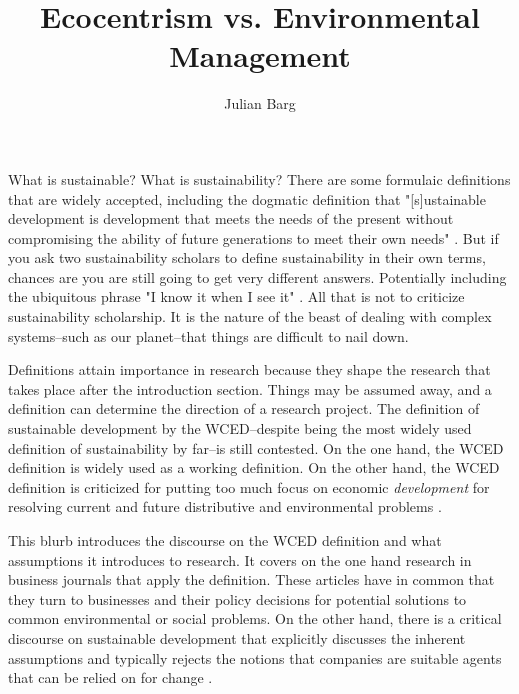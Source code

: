 \documentclass{article}
\title{Ecocentrism vs. Environmental Management}
\author{Julian Barg}
\begin{document}
	\maketitle

	What is sustainable? What is sustainability? There are some formulaic definitions that are widely accepted, including the dogmatic definition that "[s]ustainable development is development that meets the needs of the present without compromising the ability of future generations to meet their own needs" \citep[IV]{WCED1987}. But if you ask two sustainability scholars to define sustainability in their own terms, chances are you are still going to get very different answers. Potentially including the ubiquitous phrase "I know it when I see it" \citep{White2013}. All that is not to criticize sustainability scholarship. It is the nature of the beast of dealing with complex systems--such as our planet--that things are difficult to nail down.

	Definitions attain importance in research because they shape the research that takes place after the introduction section. Things may be assumed away, and a definition can determine the direction of a research project. The definition of sustainable development by the WCED--despite being the most widely used definition of sustainability by far--is still contested. On the one hand, the WCED definition is widely used as a working definition. On the other hand, the WCED definition is criticized for putting too much focus on economic \textit{development} for resolving current and future distributive and environmental problems \citep[e.g.,][6f.]{Constanza2014a}.

	This blurb introduces the discourse on the WCED definition and what assumptions it introduces to research. It covers on the one hand research in business journals that apply the definition. These articles have in common that they turn to businesses and their policy decisions for potential solutions to common environmental or social problems. On the other hand, there is a critical 
	discourse on sustainable development that explicitly discusses the inherent assumptions and typically rejects the notions that companies are suitable agents that can be relied on for change \citep[e.g.,][]{Banerjee2003}.
\end{document}
